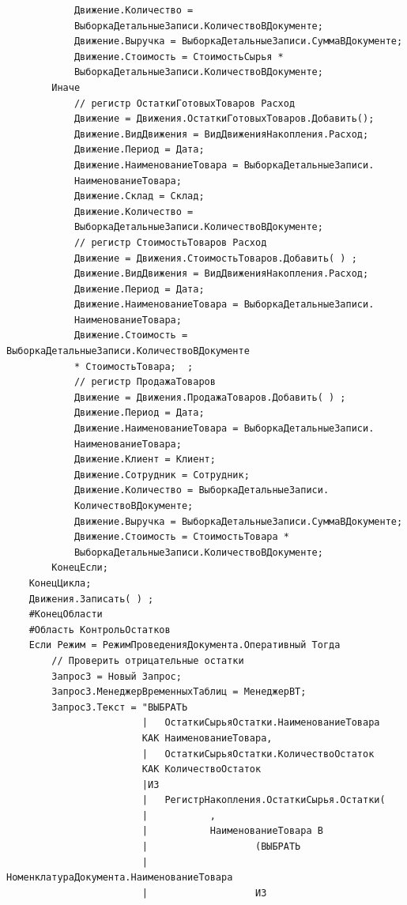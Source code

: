 \documentclass[12pt,a4paper]{article}
\begin{document}
\begin{appendices}
\begin{verbatim}
            Движение.Количество =
            ВыборкаДетальныеЗаписи.КоличествоВДокументе;
            Движение.Выручка = ВыборкаДетальныеЗаписи.СуммаВДокументе;
            Движение.Стоимость = СтоимостьСырья *
            ВыборкаДетальныеЗаписи.КоличествоВДокументе;
        Иначе      
            // регистр ОстаткиГотовыхТоваров Расход  
            Движение = Движения.ОстаткиГотовыхТоваров.Добавить();
            Движение.ВидДвижения = ВидДвиженияНакопления.Расход;
            Движение.Период = Дата;
            Движение.НаименованиеТовара = ВыборкаДетальныеЗаписи.
            НаименованиеТовара;
            Движение.Склад = Склад;
            Движение.Количество =
            ВыборкаДетальныеЗаписи.КоличествоВДокументе;  
            // регистр СтоимостьТоваров Расход
            Движение = Движения.СтоимостьТоваров.Добавить( ) ;
            Движение.ВидДвижения = ВидДвиженияНакопления.Расход;
            Движение.Период = Дата;
            Движение.НаименованиеТовара = ВыборкаДетальныеЗаписи.
            НаименованиеТовара;
            Движение.Стоимость = ВыборкаДетальныеЗаписи.КоличествоВДокументе
            * СтоимостьТовара;  ;
            // регистр ПродажаТоваров		
            Движение = Движения.ПродажаТоваров.Добавить( ) ;
            Движение.Период = Дата;
            Движение.НаименованиеТовара = ВыборкаДетальныеЗаписи.
            НаименованиеТовара;
            Движение.Клиент = Клиент;
            Движение.Сотрудник = Сотрудник;
            Движение.Количество = ВыборкаДетальныеЗаписи.
            КоличествоВДокументе;
            Движение.Выручка = ВыборкаДетальныеЗаписи.СуммаВДокументе;
            Движение.Стоимость = СтоимостьТовара *
            ВыборкаДетальныеЗаписи.КоличествоВДокументе;
        КонецЕсли;
    КонецЦикла;
    Движения.Записать( ) ;
    #КонецОбласти
    #Область КонтрольОстатков
    Если Режим = РежимПроведенияДокумента.Оперативный Тогда
        // Проверить отрицательные остатки 
        Запрос3 = Новый Запрос;
        Запрос3.МенеджерВременныхТаблиц = МенеджерВТ;
        Запрос3.Текст = "ВЫБРАТЬ
                        |	ОстаткиСырьяОстатки.НаименованиеТовара
                        КАК НаименованиеТовара,
                        |	ОстаткиСырьяОстатки.КоличествоОстаток
                        КАК КоличествоОстаток
                        |ИЗ
                        |	РегистрНакопления.ОстаткиСырья.Остатки(
                        |			,
                        |			НаименованиеТовара В
                        |					(ВЫБРАТЬ
                        |						НоменклатураДокумента.НаименованиеТовара
                        |					ИЗ

\end{verbatim}
\end{appendices}
\end{document}
